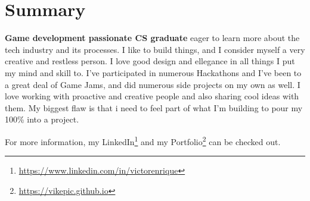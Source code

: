 \section{Summary}

\textbf{Game development passionate CS graduate} eager to learn more about the tech industry and its processes. I like to build things, and I consider myself a very creative and restless person. I love good design and ellegance in all things I put my mind and skill to. I've participated in numerous Hackathons and I've been to a great deal of Game Jams, and did numerous side projects on my own as well. I love working with proactive and creative people and also sharing cool ideas with them. My biggest flaw is that i need to feel part of what I'm building to pour my 100\% into a project.

For more information, my LinkedIn\footnote{\url{https://www.linkedin.com/in/victorenrique}} and my Portfolio\footnote{\url{https://vikepic.github.io}} can be checked out.
